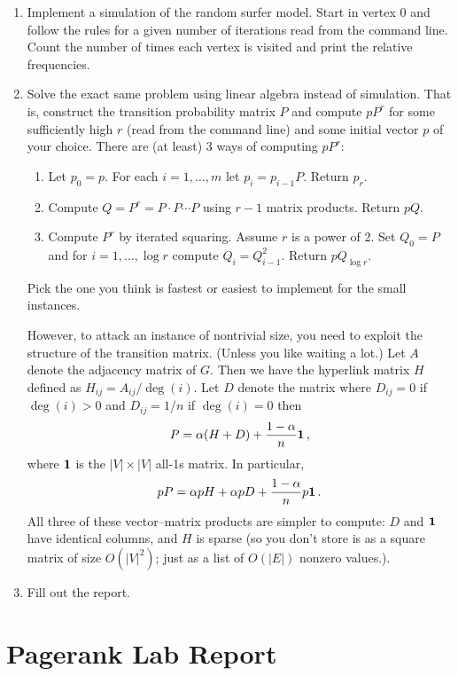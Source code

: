 \documentclass{tufte-handout}
\begin{document}
\begin{enumerate}
\item Implement a simulation of the random surfer model. 
  Start in
  vertex 0 and follow the rules for a given number of iterations read
  from the command line. Count the number of times each vertex is
  visited and print the relative frequencies.
\item Solve the exact same problem using linear algebra instead of
  simulation.
  That is, construct the transition probability matrix $P$ and
  compute $pP^r$ for some sufficiently high $r$ (read from the command
  line) and some initial vector $p$ of your choice.
  There are (at least) 3 ways of computing $pP^r$:
  \begin{enumerate} 
  \item Let $p_0= p$. For each $i=1,\ldots, m$ let $p_i = p_{i-1}
    P$. Return $p_r$.
  \item Compute $Q = P^r = P\cdot P \cdots P$ using $r-1$ matrix products.
    Return $pQ$.
  \item Compute $P^r$ by iterated squaring. Assume $r$ is a power of
    2. Set $Q_0 = P$ and for $i=1,\ldots,\log r$ compute $Q_i =
    Q_{i-1}^2$. Return $pQ_{\log r}$. 
  \end{enumerate}
  Pick the one you think is fastest or easiest to implement for the
  small instances.

  However, to attack an instance of nontrivial size, you need to
  exploit the structure of the transition matrix.
  (Unless you like waiting a lot.)
  Let $A$ denote the adjacency matrix of $G$.
  Then we have the hyperlink matrix $H$ defined as $H_{ij} = A_{ij} /
  \deg(i)$.
  Let $D$ denote the matrix where $D_{ij} = 0$ if $\deg(i) > 0 $ and
  $D_{ij} = 1/n$ if $\deg(i) = 0$ then
  \[ P = \alpha(H + D) + \frac{1-\alpha}{n} \bf 1\,,\]
  where $\bf 1$ is the $|V|\times |V|$ all-1s matrix.
  In particular,
  \[pP = \alpha p H + \alpha p D + \frac{1-\alpha}{n} p \bf 1\,.\] All
  three of these vector--matrix products are simpler to compute: $D$
  and $\bf 1$ have identical columns, and $H$ is sparse (so you don't
  store is as a square matrix of size $O(|V|^2)$; just as a list of
  $O(|E|)$ nonzero values.).
\item Fill out the report.
\end{enumerate}


\newpage
\section{Pagerank Lab Report}
\end{document}
